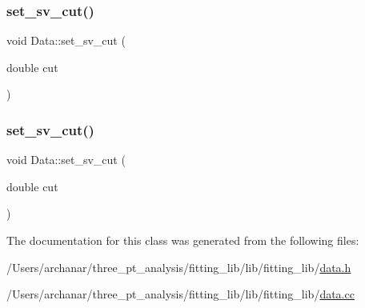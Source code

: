 \subsubsection{\texorpdfstring{set\_sv\_cut()}{set\_sv\_cut()}\hspace{0.1cm}{\footnotesize\ttfamily [1/2]}}
{\footnotesize\ttfamily void Data\+::set\+\_\+sv\+\_\+cut (\begin{DoxyParamCaption}\item[{double}]{cut }\end{DoxyParamCaption})\hspace{0.3cm}{\ttfamily [inline]}}

\mbox{\label{classData_a8faffbd514fe8831470ce0e982c048da}} 
\subsubsection{\texorpdfstring{set\_sv\_cut()}{set\_sv\_cut()}\hspace{0.1cm}{\footnotesize\ttfamily [2/2]}}
{\footnotesize\ttfamily void Data\+::set\+\_\+sv\+\_\+cut (\begin{DoxyParamCaption}\item[{double}]{cut }\end{DoxyParamCaption})\hspace{0.3cm}{\ttfamily [inline]}}



The documentation for this class was generated from the following files\+:\begin{DoxyCompactItemize}
\item 
/\+Users/archanar/three\+\_\+pt\+\_\+analysis/fitting\+\_\+lib/lib/fitting\+\_\+lib/\mbox{\hyperlink{lib_2fitting__lib_2data_8h}{data.\+h}}\item 
/\+Users/archanar/three\+\_\+pt\+\_\+analysis/fitting\+\_\+lib/lib/fitting\+\_\+lib/\mbox{\hyperlink{data_8cc}{data.\+cc}}\end{DoxyCompactItemize}
